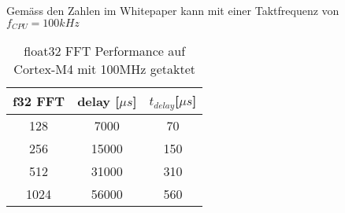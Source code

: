 Gemäss den Zahlen im Whitepaper kann mit einer Taktfrequenz von $f_{CPU}=100\si{kHz}$

\begin{table}[H]
	\centering
	\begin{tabular}{|c|c|c|}
		\hline
		\textbf{f32 FFT} & \textbf{delay {[}$\mu s${]}} & \textbf{$t_{delay}${[}$\mu\si{s}${]}} \\ \hline
		128              & 7000                & 70                             \\ \hline
		256              & 15000               & 150                            \\ \hline
		512              & 31000               & 310                            \\ \hline
		1024             & 56000               & 560                            \\ \hline
	\end{tabular}
	\caption{float32 FFT Performance auf Cortex-M4 mit 100MHz getaktet}
	\label{tab:FFT_performance}
\end{table}





